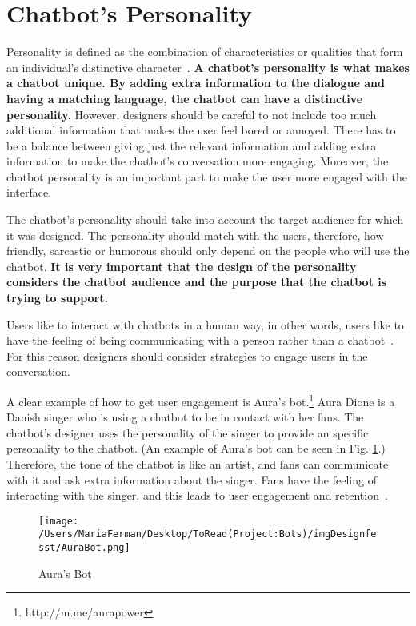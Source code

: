 \documentclass[a4paper,10pt]{article}
\begin{document}
\section{Chatbot's Personality}

Personality is defined as the combination of characteristics or qualities that form an individual's distinctive character~\cite{Oxford}. \textbf{A chatbot’s personality is what makes a chatbot unique. By adding extra information to the dialogue and having a matching language, the chatbot can have a distinctive personality.} However, designers should be careful to not include too much additional information that makes the user feel bored or annoyed. There has to be a balance between giving just the relevant information and adding extra information to make the chatbot's conversation more engaging. Moreover, the chatbot personality is an important part to make the user more engaged with the interface.

The chatbot’s personality should take into account the target audience for which it was designed. The personality should match with the users, therefore, how friendly, sarcastic or humorous should only depend on the people who will use the chatbot. \textbf{It is very important that the design of the personality considers the chatbot audience and the purpose that the chatbot is trying to support.}  

Users like to interact with chatbots in a human way, in other words, users like to have the feeling of being communicating with a person rather than a chatbot~\cite{HeuristicsWebPage}. For this reason designers should consider strategies to engage users in the conversation. 

A clear example of how to get user engagement is Aura's bot.\footnote{http://m.me/aurapower} Aura Dione is a Danish singer who is using a chatbot to be in contact with her fans. The chatbot's designer uses the personality of the singer to provide an specific personality to the chatbot. (An example of Aura's bot can be seen in  Fig. \ref{FigureAura}.) Therefore, the tone of the chatbot is like an artist, and fans can communicate with it and ask extra information about the singer. Fans have the feeling of interacting with the singer, and this leads to user engagement and retention~\cite{personality}.  

\begin{figure}
\centering
\texttt{[image: /Users/MariaFerman/Desktop/ToRead(Project:Bots)/imgDesignfesst/AuraBot.png]}
\caption{Aura's Bot}
\label{FigureAura}
\end{figure}
\end{document}
